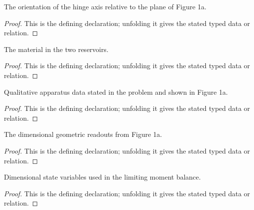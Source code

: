 \begin{definition}[AxisOrientation]
  \label{decl:physics:IPhO_2026_1_A_1:AxisOrientation}
  The orientation of the hinge axis relative to the plane of Figure 1a.
\end{definition}
\begin{proof}
  This is the defining declaration; unfolding it gives the stated typed data or relation.
\end{proof}

\begin{definition}[ReservoirFluid]
  \label{decl:physics:IPhO_2026_1_A_1:ReservoirFluid}
  The material in the two reservoirs.
\end{definition}
\begin{proof}
  This is the defining declaration; unfolding it gives the stated typed data or relation.
\end{proof}

\begin{definition}[GateConfiguration]
  \label{decl:physics:IPhO_2026_1_A_1:GateConfiguration}
  Qualitative apparatus data stated in the problem and shown in Figure 1a.
\end{definition}
\begin{proof}
  This is the defining declaration; unfolding it gives the stated typed data or relation.
\end{proof}

\begin{definition}
  \label{decl:physics:IPhO_2026_1_A_1:Figure1aGeometry}
  The dimensional geometric readouts from Figure 1a.
\end{definition}
\begin{proof}
  This is the defining declaration; unfolding it gives the stated typed data or relation.
\end{proof}

\begin{definition}[HydrostaticGateState]
  \label{decl:physics:IPhO_2026_1_A_1:HydrostaticGateState}
  Dimensional state variables used in the limiting moment balance.
\end{definition}
\begin{proof}
  This is the defining declaration; unfolding it gives the stated typed data or relation.
\end{proof}

